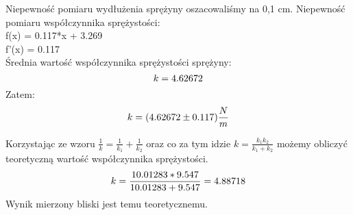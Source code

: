 \documentclass[11pt,a4paper]{article}
\begin{document}
    Niepewność pomiaru wydłużenia sprężyny oszacowaliśmy na 0,1 cm.
    Niepewność pomiaru współczynnika sprężystości:
    \\f(x) = 0.117*x + 3.269 \\
    f'(x) = 0.117 \\
    
    Średnia wartość współczynnika sprężystości sprężyny:
    \[ k = \pgfmathparse{((4*(3.14)^2 * 0.050155  / ((13.91+13.88+13.96)/(3*20))^2) + (4*(3.14)^2 * 0.100478  / ((18.58+18.45+18.40)/(3*20))^2) + (4*(3.14)^2 * 0.150614  / ((22.16+22.15+22.16)/(3*20))^2) + (4*(3.14)^2 * 0.200790  / ((25.32+25.36+25.30)/(3*20))^2))/4}\pgfmathresult \]
    Zatem: 
    \[ k = (\pgfmathparse{((4*(3.14)^2 * 0.050155  / ((13.91+13.88+13.96)/(3*20))^2) + (4*(3.14)^2 * 0.100478  / ((18.58+18.45+18.40)/(3*20))^2) + (4*(3.14)^2 * 0.150614  / ((22.16+22.15+22.16)/(3*20))^2) + (4*(3.14)^2 * 0.200790  / ((25.32+25.36+25.30)/(3*20))^2))/4}\pgfmathresult \pm  0.117) \frac{N}{m} \]
    \pagebreak
    
    Korzystając ze wzoru $\frac{1}{k} = \frac{1}{k_1} + \frac{1}{k_2}$ oraz co za tym idzie $k = \frac{k_1k_2}{k_1+k_2}$ możemy obliczyć teoretyczną wartość współczynnika sprężystości.
    \[ k = \frac{10.01283 * 9.547}{10.01283 +  9.547} = \pgfmathparse{(10.01283*9.547)/(10.01283 +  9.547)}\pgfmathresult\]
    Wynik mierzony bliski jest temu teoretycznemu.
    
\end{document}
